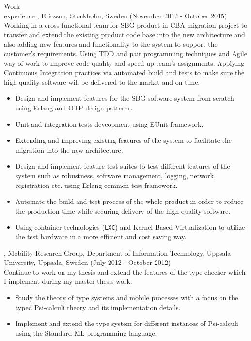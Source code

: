 \documentclass{resume}
\begin{document}
\begin{category}{Work \\experience}
, Ericsson, Stockholm, Sweden (November 2012 - October 2015)\\
Working in a cross functional team for SBG product in CBA migration project to 
transfer and extend the existing product code base into the new architecture and also 
adding new features and functionality to the system to support the customer's requirements.
Using TDD and pair programming techniques and Agile way of work to improve code quality and
speed up team's assignments. Applying Continuous Integration practices via automated build and tests to 
make sure the high quality software will be delivered to the market and on time.
\begin{itemize}
 \item Design and implement features for the SBG software system from scratch using 
       Erlang and OTP design patterns.
 \item Unit and integration tests deveopment using EUnit framework. 
 \item Extending and improving existing features of the system to facilitate the 
       migration into the new architecture.
 \item Design and implement feature test suites to test different features of the 
       system such as robustness, software management, logging, network, registration 
       etc. using Erlang common test framework.
 \item Automate the build and test process of the whole product in order to reduce the production time
       while securing delivery of the high quality software.
 \item Using container technologies (\texttt{LXC}) and Kernel Based Virtualization to utilize the 
       test hardware in a more efficient and cost saving way.
\end{itemize}

, Mobility Research Group, Department of Information Technology, 
Uppsala University, Uppsala, Sweden (July 2012 - October 2012)\\
Continue to work on my thesis and extend the features of the type checker which I 
implement during my master thesis work.
\begin{itemize}
 \item Study the theory of type systems and mobile processes with a 
       focus on the typed Psi-calculi theory and its implementation details.
 \item Implement and extend the type system for different instances of Psi-calculi 
       using the Standard ML programming language.
\end{itemize}


\end{category}
\end{document}
